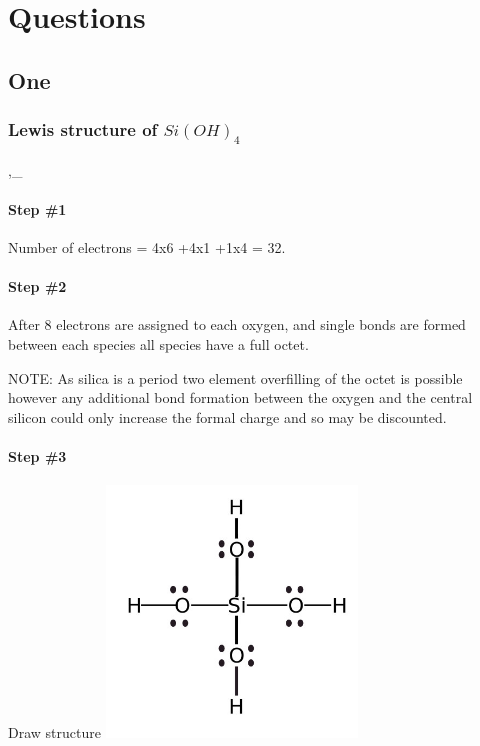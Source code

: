 \documentclass[]{article}
\date{}
\let\oldparagraph\paragraph
\renewcommand{\paragraph}[1]{\oldparagraph{#1}\mbox{}}
\begin{document}
\hypertarget{questions}{%
\section{Questions}\label{questions}}

\hypertarget{one}{%
\subsection{One}\label{one}}

\hypertarget{lewis-structure-of-sioh_4}{%
\subsubsection{\texorpdfstring{Lewis structure of
\(Si(OH)_4\)}{Lewis structure of Si(OH)\_4}}\label{lewis-structure-of-sioh_4}}

,\_

\hypertarget{step-1}{%
\paragraph{Step \#1}\label{step-1}}

Number of electrons = 4x6 +4x1 +1x4 = 32.

\hypertarget{step-2}{%
\paragraph{Step \#2}\label{step-2}}

After 8 electrons are assigned to each oxygen, and single bonds are
formed between each species all species have a full octet.

NOTE: As silica is a period two element overfilling of the octet is
possible however any additional bond formation between the oxygen and
the central silicon could only increase the formal charge and so may be
discounted.

\hypertarget{step-3}{%
\paragraph{Step \#3}\label{step-3}}

Draw structure
\includegraphics[width=0.5\textwidth,height=\textheight]{Images/SiliconHydroxideLewisStructure.jpg}
\end{document}
